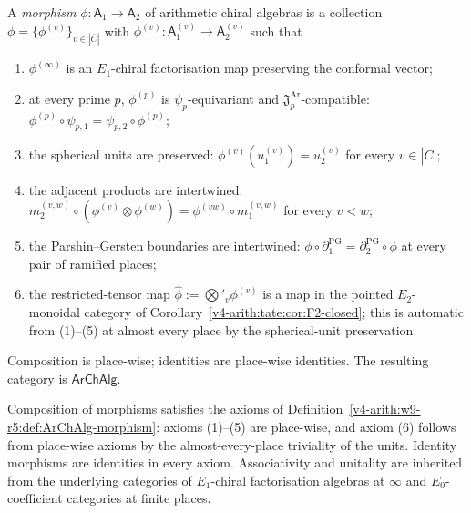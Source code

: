 \begin{definition}
\label{v4-arith:w9-r5:def:ArChAlg-morphism}
A \emph{morphism} \(\phi\colon\mathsf{A}_{1}\to\mathsf{A}_{2}\) of
arithmetic chiral algebras is a collection
\(\phi=\{\phi^{(v)}\}_{v\in|\overline{C}|}\) with
\(\phi^{(v)}\colon\mathsf{A}_{1}^{(v)}\to\mathsf{A}_{2}^{(v)}\) such
that
\begin{enumerate}
\item \(\phi^{(\infty)}\) is an \(E_{1}\)-chiral factorisation map
preserving the conformal vector;
\item at every prime \(p\), \(\phi^{(p)}\) is \(\psi_{p}\)-equivariant and
\(\mathfrak{J}^{\mathrm{Ar}}_{p}\)-compatible: \(\phi^{(p)}\circ\psi_{p,1}=\psi_{p,2}\circ\phi^{(p)}\);
\item the spherical units are preserved: \(\phi^{(v)}(u_{1}^{(v)})=u_{2}^{(v)}\)
for every \(v\in|\overline{C}|\);
\item the adjacent products are intertwined:
\(m_{2}^{(v,w)}\circ(\phi^{(v)}\otimes\phi^{(w)})=\phi^{(vw)}\circ m_{1}^{(v,w)}\)
for every \(v<w\);
\item the Parshin--Gersten boundaries are intertwined:
\(\phi\circ\partial_{1}^{\mathrm{PG}}=\partial_{2}^{\mathrm{PG}}\circ\phi\)
at every pair of ramified places;
\item the restricted-tensor map
\(\widehat{\phi}:=\bigotimes'_{v}\phi^{(v)}\) is a map in the pointed
\(E_{2}\)-monoidal category of
Corollary~\ref{v4-arith:tate:cor:F2-closed}; this is automatic from (1)--(5)
at almost every place by the spherical-unit preservation.
\end{enumerate}
Composition is place-wise; identities are place-wise identities. The
resulting category is \(\mathsf{ArChAlg}\).
\end{definition}

\begin{proposition}
\label{v4-arith:w9-r5:prop:ArChAlg-is-category}
Composition of morphisms satisfies the
axioms of Definition~\ref{v4-arith:w9-r5:def:ArChAlg-morphism}: axioms (1)--(5)
are place-wise, and axiom (6) follows from place-wise axioms by the
almost-every-place triviality of the units. Identity morphisms are
identities in every axiom. Associativity and unitality are
inherited from the underlying categories of \(E_{1}\)-chiral
factorisation algebras at \(\infty\) and \(E_{0}\)-coefficient categories
at finite places.
\end{proposition}

